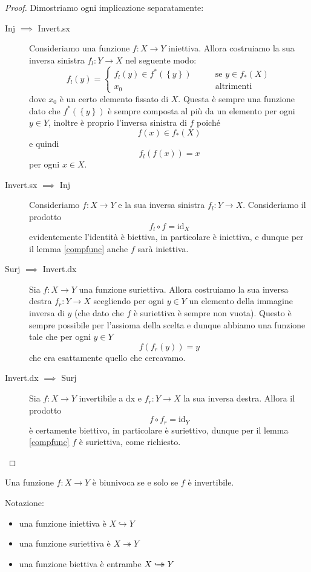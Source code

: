 \documentclass[11pt]{scrartcl}
\newcommand{\bij}{\hookrightarrow\mathrel{\mspace{-15mu}}\rightarrow}
\begin{document}
	\begin{proof}
		Dimostriamo ogni implicazione separatamente:
		\begin{description}
			\item[Inj $\implies$ Invert.sx] Consideriamo una funzione $f:X\to Y$ iniettiva. Allora costruiamo la sua inversa sinistra $f_l:Y\to X$ nel seguente modo:
			$$f_l(y)=\begin{cases}
				f_l(y)\in f^*(\left\{y\right\}) \quad \quad &\text{se }y\in f_*(X)\\
				x_0 								&\text{altrimenti}
			\end{cases}$$
			dove $x_0$ è un certo elemento fissato di $X$. Questa è sempre una funzione dato che $f^*\left(\left\{y\right\}\right)$ è sempre composta al più da un elemento per ogni $y\in Y$, inoltre è proprio l'inversa sinistra di $f$ poiché
			$$f(x)\in f_*(X)$$
			e quindi 
			$$f_l(f(x))=x$$
			per ogni $x\in X$.
			\item[Invert.sx $\implies$ Inj] Consideriamo $f:X\to Y$ e la sua inversa sinistra $f_l:Y\to X$. Consideriamo il prodotto
			$$f_l\circ f=\text{id}_X$$
			evidentemente l'identità è biettiva, in particolare è iniettiva, e dunque per il lemma \ref{compfunc} anche $f$ sarà iniettiva.
			\item[Surj $\implies$ Invert.dx] Sia $f:X\to Y$ una funzione suriettiva. Allora costruiamo la sua inversa destra $f_r:Y\to X$ scegliendo per ogni $y\in Y$ un elemento della immagine inversa di ${y}$ (che dato che $f$ è suriettiva è sempre non vuota). Questo è sempre possibile per l'assioma della scelta e dunque abbiamo una funzione tale che per ogni $y\in Y$
			$$f(f_r(y))=y$$ 
			che era esattamente quello che cercavamo.
			\item[Invert.dx $\implies$ Surj] Sia $f:X\to Y$ invertibile a dx e $f_r:Y\to X$ la sua inversa destra. Allora il prodotto
			$$f\circ f_r=\text{id}_Y$$
			è certamente biettivo, in particolare è suriettivo, dunque per il lemma \ref{compfunc} $f$ è suriettiva, come richiesto.
		\end{description}
	\end{proof}
	
	\begin{corollary}
		Una funzione $f:X\to Y$ è biunivoca se e solo se $f$ è invertibile.
	\end{corollary}
	
	\begin{definition}
		Notazione:
		\begin{itemize}
			\item una funzione iniettiva è $X\hookrightarrow Y$
			\item una funzione suriettiva è $X\twoheadrightarrow Y$
			\item una funzione biettiva è entrambe $X\bij Y$
		\end{itemize}
	\end{definition}
	
\end{document}
